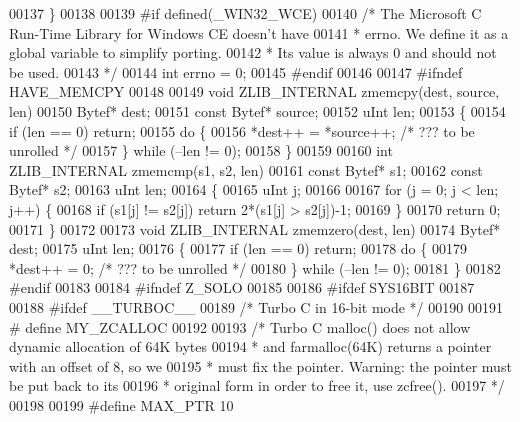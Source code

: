 \begin{DoxyCode}
{00137 \}
00138 
00139 \textcolor{preprocessor}{#if defined(\_WIN32\_WCE)}
00140     \textcolor{comment}{/* The Microsoft C Run-Time Library for Windows CE doesn't have}
00141 \textcolor{comment}{     * errno.  We define it as a global variable to simplify porting.}
00142 \textcolor{comment}{     * Its value is always 0 and should not be used.}
00143 \textcolor{comment}{     */}
00144     \textcolor{keywordtype}{int} errno = 0;
00145 \textcolor{preprocessor}{#endif}
00146 
00147 \textcolor{preprocessor}{#ifndef HAVE\_MEMCPY}
00148 
00149 \textcolor{keywordtype}{void} ZLIB\_INTERNAL zmemcpy(dest, source, len)
00150     Bytef* dest;
00151     \textcolor{keyword}{const} Bytef* source;
00152     uInt  len;
00153 \{
00154     \textcolor{keywordflow}{if} (len == 0) \textcolor{keywordflow}{return};
00155     \textcolor{keywordflow}{do} \{
00156         *dest++ = *source++; \textcolor{comment}{/* ??? to be unrolled */}
00157     \} \textcolor{keywordflow}{while} (--len != 0);
00158 \}
00159 
00160 \textcolor{keywordtype}{int} ZLIB\_INTERNAL zmemcmp(s1, s2, len)
00161     \textcolor{keyword}{const} Bytef* s1;
00162     \textcolor{keyword}{const} Bytef* s2;
00163     uInt  len;
00164 \{
00165     uInt j;
00166 
00167     \textcolor{keywordflow}{for} (j = 0; j < len; j++) \{
00168         \textcolor{keywordflow}{if} (s1[j] != s2[j]) \textcolor{keywordflow}{return} 2*(s1[j] > s2[j])-1;
00169     \}
00170     \textcolor{keywordflow}{return} 0;
00171 \}
00172 
00173 \textcolor{keywordtype}{void} ZLIB\_INTERNAL zmemzero(dest, len)
00174     Bytef* dest;
00175     uInt  len;
00176 \{
00177     \textcolor{keywordflow}{if} (len == 0) \textcolor{keywordflow}{return};
00178     \textcolor{keywordflow}{do} \{
00179         *dest++ = 0;  \textcolor{comment}{/* ??? to be unrolled */}
00180     \} \textcolor{keywordflow}{while} (--len != 0);
00181 \}
00182 \textcolor{preprocessor}{#endif}
00183 
00184 \textcolor{preprocessor}{#ifndef Z\_SOLO}
00185 
00186 \textcolor{preprocessor}{#ifdef SYS16BIT}
00187 
00188 \textcolor{preprocessor}{#ifdef \_\_TURBOC\_\_}
00189 \textcolor{comment}{/* Turbo C in 16-bit mode */}
00190 
00191 \textcolor{preprocessor}{#  define MY\_ZCALLOC}
00192 
00193 \textcolor{comment}{/* Turbo C malloc() does not allow dynamic allocation of 64K bytes}
00194 \textcolor{comment}{ * and farmalloc(64K) returns a pointer with an offset of 8, so we}
00195 \textcolor{comment}{ * must fix the pointer. Warning: the pointer must be put back to its}
00196 \textcolor{comment}{ * original form in order to free it, use zcfree().}
00197 \textcolor{comment}{ */}
00198 
00199 \textcolor{preprocessor}{#define MAX\_PTR 10}
}
\end{DoxyCode}
